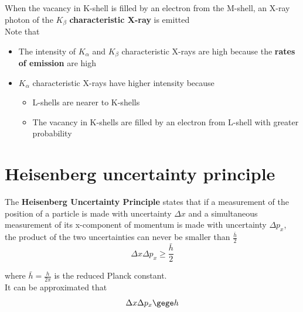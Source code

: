 \documentclass[a4paper, 10pt]{article}
\begin{document}
   When the vacancy in K-shell is filled by an electron from the M-shell, an X-ray photon of the $K_{\beta}$ \textbf{characteristic X-ray} is emitted \\
Note that
\begin{itemize}
   \item The intensity of $K_{\alpha}$ and $K_{\beta}$ characteristic X-rays are high because the \textbf{rates of emission} are high
   \item $K_{\alpha}$ characteristic X-rays have higher intensity because 
      \begin{itemize}
         \item L-shells are nearer to K-shells 
         \item The vacancy in K-shells are filled by an electron from L-shell  with greater probability
      \end{itemize}	
\end{itemize}	

\section{Heisenberg uncertainty principle}
\begin{framed}
   The \textbf{Heisenberg Uncertainty Principle} states that if a measurement of the position of a particle is made with uncertainty $\Delta x$  and a simultaneous measurement of its x-component of momentum is made with uncertainty $\Delta p_x$, the product of the two uncertainties can never be smaller than $\frac{\bar h}{2}$ 
   \[
   \Delta x \Delta p_x \ge \frac{\bar h}{2}
   \]

   where $\bar h = \frac{h}{2\pi}$ is the reduced Planck constant. \\

   It can be approximated that 
   \[
   \Delta x \Delta p_x \gege h
   \]
   
   
\end{framed}	
\end{document}
